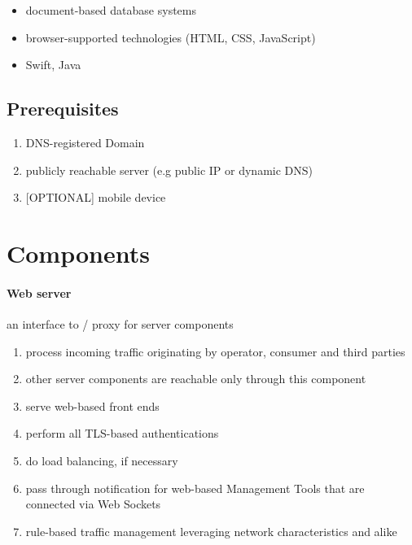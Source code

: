\documentclass[12pt,english,a4paper,titlepage,cleardoublepage=empty,dottedtoc]{report}
\providecommand{\tightlist}{%
  \setlength{\itemsep}{0pt}\setlength{\parskip}{0pt}}
\begin{document}
\begin{itemize}
\tightlist
\item
  document-based database systems
\item
  browser-supported technologies (HTML, CSS, JavaScript)
\item
  Swift, Java
\end{itemize}

\subsection*{Prerequisites}\label{prerequisites}

\begin{enumerate}
\def\labelenumi{\alph{enumi})}
\tightlist
\item
  DNS-registered Domain
\item
  publicly reachable server (e.g public IP or dynamic DNS)
\item
  {[}OPTIONAL{]} mobile device
\end{enumerate}

\section{Components}\label{components}

\paragraph{Web server}\label{web-server}

an interface to / proxy for server components

\begin{enumerate}
\def\labelenumi{\alph{enumi})}
\tightlist
\item
  process incoming traffic originating by operator, consumer and third
  parties
\item
  other server components are reachable only through this component
\item
  serve web-based front ends
\item
  perform all TLS-based authentications
\item
  do load balancing, if necessary
\item
  pass through notification for web-based Management Tools that are
  connected via Web Sockets
\item
  rule-based traffic management leveraging network characteristics and
  alike
\end{enumerate}
\end{document}
